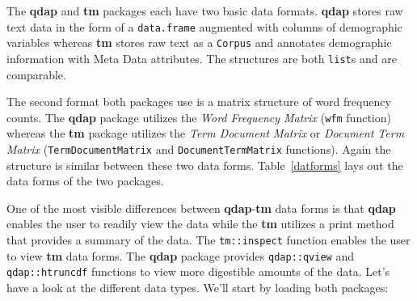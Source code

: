 \documentclass{article}\usepackage[]{graphicx}\usepackage[]{color}
\begin{document}
\hspace{.4cm} The \textbf{qdap} and \textbf{tm} packages each have two basic data formats.  \textbf{qdap} stores raw text data in the form of a \texttt{data.frame} augmented with columns of demographic variables whereas \textbf{tm} stores raw text as a \texttt{Corpus} and annotates demographic information with Meta Data attributes.  The structures are both \texttt{list}s and are comparable.

The second format both packages use is a matrix structure of word frequency counts.  The \textbf{qdap} package utilizes the \emph{Word Frequency Matrix} (\texttt{wfm} function) whereas the \textbf{tm} package utilizes the \emph{Term Document Matrix} or \emph{Document Term Matrix} (\texttt{TermDocumentMatrix} and \texttt{DocumentTermMatrix} functions).  Again the structure is similar between these two data forms.  Table~\ref{datforms} lays out the data forms of the two packages.



\begin{singlespace}
\begin{table}[!ht]
\begin{center}
\end{center}
\end{table}
\end{singlespace}

One of the most visible differences between \textbf{qdap}-\textbf{tm} data forms is that \textbf{qdap} enables the user to readily view the data while the \textbf{tm} utilizes a print method that provides a summary of the data.  The \texttt{tm::inspect} function enables the user to view \textbf{tm} data forms. The \textbf{qdap} package provides \texttt{qdap::qview} and \texttt{qdap::htruncdf} functions to view more digestible amounts of the data. Let's have a look at the different data types.  We'll start by loading both packages:
\end{document}
